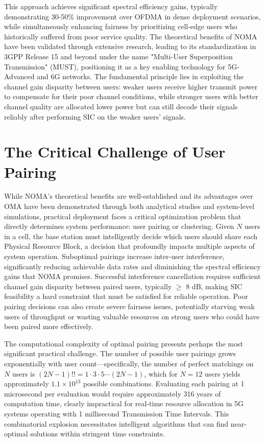 This approach achieves significant spectral efficiency gains, typically demonstrating 30-50\% improvement over OFDMA in dense deployment scenarios, while simultaneously enhancing fairness by prioritizing cell-edge users who historically suffered from poor service quality. The theoretical benefits of NOMA have been validated through extensive research, leading to its standardization in 3GPP Release 15 and beyond under the name "Multi-User Superposition Transmission" (MUST), positioning it as a key enabling technology for 5G-Advanced and 6G networks. The fundamental principle lies in exploiting the channel gain disparity between users: weaker users receive higher transmit power to compensate for their poor channel conditions, while stronger users with better channel quality are allocated lower power but can still decode their signals reliably after performing SIC on the weaker users' signals.

\section{The Critical Challenge of User Pairing}

While NOMA's theoretical benefits are well-established and its advantages over OMA have been demonstrated through both analytical studies and system-level simulations, practical deployment faces a critical optimization problem that directly determines system performance: user pairing or clustering. Given $N$ users in a cell, the base station must intelligently decide which users should share each Physical Resource Block, a decision that profoundly impacts multiple aspects of system operation. Suboptimal pairings increase inter-user interference, significantly reducing achievable data rates and diminishing the spectral efficiency gains that NOMA promises. Successful interference cancellation requires sufficient channel gain disparity between paired users, typically $\geq$ 8 dB, making SIC feasibility a hard constraint that must be satisfied for reliable operation. Poor pairing decisions can also create severe fairness issues, potentially starving weak users of throughput or wasting valuable resources on strong users who could have been paired more effectively.

The computational complexity of optimal pairing presents perhaps the most significant practical challenge. The number of possible user pairings grows exponentially with user count—specifically, the number of perfect matchings on $N$ users is $(2N-1)!! = 1 \cdot 3 \cdot 5 \cdots (2N-1)$, which for $N=12$ users yields approximately $1.1 \times 10^{13}$ possible combinations. Evaluating each pairing at 1 microsecond per evaluation would require approximately 316 years of computation time, clearly impractical for real-time resource allocation in 5G systems operating with 1 millisecond Transmission Time Intervals. This combinatorial explosion necessitates intelligent algorithms that can find near-optimal solutions within stringent time constraints.

